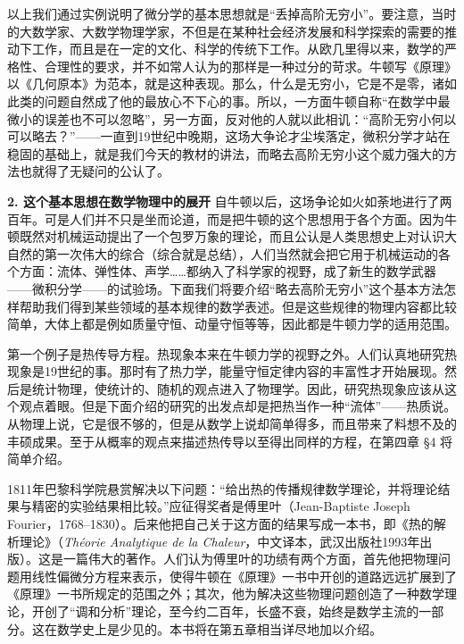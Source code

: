 以上我们通过实例说明了微分学的基本思想就是“丢掉高阶无穷小”。要注意，当时的大数学家、大数学物理学家，不但是在某种社会经济发展和科学探索的需要的推动下工作，而且是在一定的文化、科学的传统下工作。从欧几里得以来，数学的严格性、合理性的要求，并不如常人认为的那样是一种过分的苛求。牛顿写《原理》以《几何原本》为范本，就是这种表现。那么，什么是无穷小，它是不是零，诸如此类的问题自然成了他的最放心不下心的事。所以，一方面牛顿自称“在数学中最微小的误差也不可以忽略”，另一方面，反对他的人就以此相讥：“高阶无穷小何以可以略去？”——一直到19世纪中晚期，这场大争论才尘埃落定，微积分学才站在稳固的基础上，就是我们今天的教材的讲法，而略去高阶无穷小这个威力强大的方法也就得了无疑问的公认了。

\medskip
\noindent\textbf{2. 这个基本思想在数学物理中的展开}\quad
自牛顿以后，这场争论如火如荼地进行了两百年。可是人们并不只是坐而论道，而是把牛顿的这个思想用于各个方面。因为牛顿既然对机械运动提出了一个包罗万象的理论，而且公认是人类思想史上对认识大自然的第一次伟大的综合（综合就是总结），人们当然就会把它用于机械运动的各个方面：流体、弹性体、声学……都纳入了科学家的视野，成了新生的数学武器——微积分学——的试验场。下面我们将要介绍“略去高阶无穷小”这个基本方法怎样帮助我们得到某些领域的基本规律的数学表述。但是这些规律的物理内容都比较简单，大体上都是例如质量守恒、动量守恒等等，因此都是牛顿力学的适用范围。

第一个例子是热传导方程。热现象本来在牛顿力学的视野之外。人们认真地研究热现象是19世纪的事。那时有了热力学，能量守恒定律内容的丰富性才开始展现。然后是统计物理，使统计的、随机的观点进入了物理学。因此，研究热现象应该从这个观点着眼。但是下面介绍的研究的出发点却是把热当作一种“流体”——热质说。从物理上说，它是很不够的，但是从数学上说却简单得多，而且带来了料想不及的丰硕成果。至于从概率的观点来描述热传导以至得出同样的方程，在第四章 §4 将简单介绍。

1811年巴黎科学院悬赏解决以下问题：“给出热的传播规律数学理论，并将理论结果与精密的实验结果相比较。”应征得奖者是傅里叶（Jean-Baptiste Joseph Fourier，1768--1830）。后来他把自己关于这方面的结果写成一本书，即《热的解析理论》（\textit{Théorie Analytique de la Chaleur}，中文译本，武汉出版社1993年出版）。这是一篇伟大的著作。人们认为傅里叶的功绩有两个方面，首先他把物理问题用线性偏微分方程来表示，使得牛顿在《原理》一书中开创的道路远远扩展到了《原理》一书所规定的范围之外；其次，他为解决这些物理问题创造了一种数学理论，开创了“调和分析”理论，至今约二百年，长盛不衰，始终是数学主流的一部分。这在数学史上是少见的。本书将在第五章相当详尽地加以介绍。

